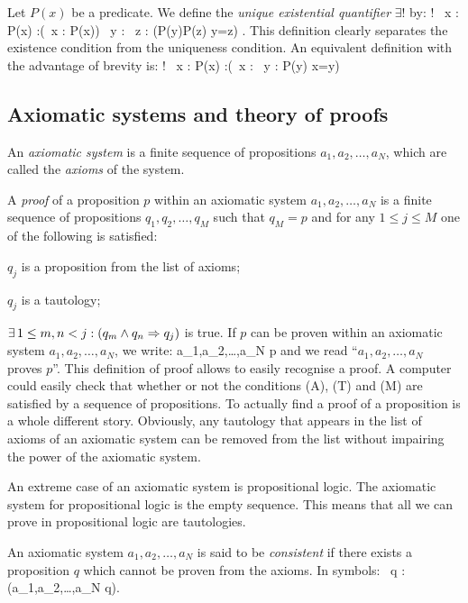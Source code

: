 \bd
Let $P(x)$ be a predicate. We define the \emph{unique existential quantifier} $\exists !$ by:
\bse
\exists ! \, x : P(x) :\eqv (\exists \, x : P(x)) \land \forall \, y : \forall \, z : (P(y)\land P(z) \imp y=z) .
\ese
\ed
This definition clearly separates the existence condition from the uniqueness condition. An equivalent definition with the advantage of brevity is:
\bse
\exists ! \, x : P(x) :\eqv (\exists \, x : \forall \, y : P(y) \eqv x=y)
\ese

\subsection{Axiomatic systems and theory of proofs}

\bd
An \emph{axiomatic system} is a finite sequence of propositions $a_1,a_2,\ldots,a_N$, which are called the \emph{axioms} of the system.
\ed

\bd
A \emph{proof} of a proposition $p$ within an axiomatic system $a_1,a_2,\ldots,a_N$ is a finite sequence of propositions $q_1,q_2,\ldots,q_M$ such that $q_M=p$ and for any $1\leq j \leq M$ one of the following is satisfied:
\ben
\item[(A)] $q_j$ is a proposition from the list of axioms;
\item[(T)] $q_j$ is a tautology;
\item[(M)] $\exists \, 1\leq m,n <j : (q_m\land q_n \Rightarrow q_j)$ is true.
\een
\ed
\br
If $p$ can be proven within an axiomatic system $a_1,a_2,\ldots,a_N$, we write:
\bse
a_1,a_2,\ldots,a_N \vdash p
\ese
and we read ``$a_1,a_2,\ldots,a_N$ proves $p$''.
\er
\br
This definition of proof allows to easily recognise a proof.
A computer could easily check that whether or not the conditions (A), (T) and (M) are satisfied by a sequence of propositions.
To actually find a proof of a proposition is a whole different story.
\er
\br
Obviously, any tautology that appears in the list of axioms of an axiomatic system can be removed from the list without impairing the power of the axiomatic system.  
\er

An extreme case of an axiomatic system is propositional logic.
The axiomatic system for propositional logic is the empty sequence.
This means that all we can prove in propositional logic are tautologies.

\bd
An axiomatic system $a_1,a_2,\ldots,a_N$ is said to be \emph{consistent} if there exists a proposition $q$ which cannot be proven from the axioms.
In symbols:
\bse
\exists \, q : \neg (a_1,a_2,\ldots,a_N \vdash q).
\ese
\ed

